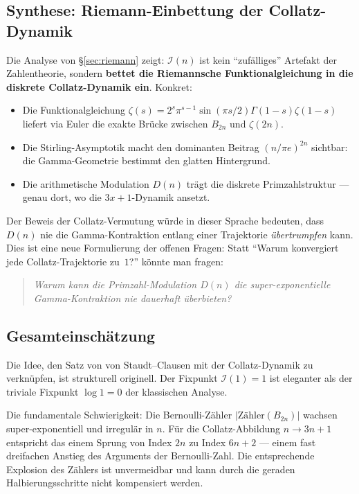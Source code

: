 \documentclass[12pt,a4paper]{article}
\newcommand{\abs}[1]{\lvert#1\rvert}
\newcommand{\In}{\mathcal{I}}      %
\newcommand{\Denom}[1]{D(#1)}     %
\begin{document}
\subsection{Synthese: Riemann-Einbettung der Collatz-Dynamik}

Die Analyse von §\ref{sec:riemann} zeigt: $\In(n)$ ist kein ``zufälliges'' Artefakt
der Zahlentheorie, sondern \textbf{bettet die Riemannsche Funktionalgleichung in die
diskrete Collatz-Dynamik ein}. Konkret:

\begin{itemize}[leftmargin=*, noitemsep]
  \item Die Funktionalgleichung $\zeta(s) = 2^s\pi^{s-1}\sin(\pi s/2)\Gamma(1-s)\zeta(1-s)$
        liefert via Euler die exakte Brücke zwischen $B_{2n}$ und $\zeta(2n)$.
  \item Die Stirling-Asymptotik macht den dominanten Beitrag $(n/\pi e)^{2n}$ sichtbar:
        die Gamma-Geometrie bestimmt den glatten Hintergrund.
  \item Die arithmetische Modulation $\Denom{n}$ trägt die diskrete Primzahlstruktur ---
        genau dort, wo die $3x+1$-Dynamik ansetzt.
\end{itemize}

Der Beweis der Collatz-Vermutung würde in dieser Sprache bedeuten, dass
$\Denom{n}$ nie die Gamma-Kontraktion entlang einer Trajektorie \emph{übertrumpfen}
kann. Dies ist eine neue Formulierung der offenen Fragen: Statt ``Warum konvergiert
jede Collatz-Trajektorie zu~$1$?'' könnte man fragen:
\begin{quote}
\emph{Warum kann die Primzahl-Modulation $\Denom{n}$ die super-exponentielle
Gamma-Kontraktion nie dauerhaft überbieten?}
\end{quote}

\subsection{Gesamteinschätzung}

Die Idee, den Satz von von Staudt--Clausen mit der Collatz-Dynamik zu verknüpfen,
ist strukturell originell. Der Fixpunkt $\In(1) = 1$ ist eleganter als der
triviale Fixpunkt $\log 1 = 0$ der klassischen Analyse.

Die fundamentale Schwierigkeit: Die Bernoulli-Zähler $\abs{\text{Zähler}(B_{2n})}$
wachsen super-exponentiell und irregulär in $n$. Für die Collatz-Abbildung $n \to 3n+1$
entspricht das einem Sprung von Index $2n$ zu Index $6n+2$ --- einem fast
dreifachen Anstieg des Arguments der Bernoulli-Zahl. Die entsprechende
Explosion des Zählers ist unvermeidbar und kann durch die geraden Halbierungsschritte
nicht kompensiert werden.
\end{document}
